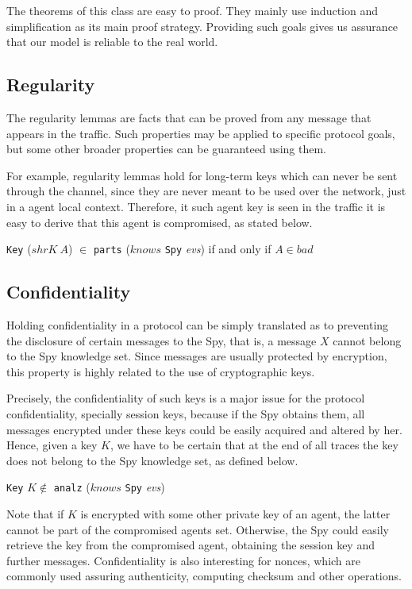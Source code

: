 The theorems of this class are easy to proof. They mainly use induction and simplification as its main proof strategy. Providing such goals gives us assurance that our model is reliable to the real world.



\subsection{Regularity}
The regularity lemmas are facts that can be proved from any message that appears in the traffic. Such properties may be applied to specific protocol goals, but some other broader properties can be guaranteed using them.

For example, regularity lemmas hold for long-term keys which can never be sent through the channel, since they are never meant to be used over the network, just in a agent local context. Therefore, it such agent key is seen in the traffic it is easy to derive that this agent is compromised, as stated below.

\begin{center}
  \texttt{Key} ($shrK\ A$) $\in$ \texttt{parts} ($knows$ \texttt{Spy} \textit{evs}) if and only if $A \in bad$
\end{center}



\subsection{Confidentiality}
Holding confidentiality in a protocol can be simply translated as to preventing the disclosure of certain messages to the Spy, that is, a message $X$ cannot belong to the Spy knowledge set. Since messages are usually protected by encryption, this property is highly related to the use of cryptographic keys.

Precisely, the confidentiality of such keys is a major issue for the protocol confidentiality, specially session keys, because if the Spy obtains them, all messages encrypted under these keys could be easily acquired and altered by her. Hence, given a key $K$, we have to be certain that at the end of all traces the key does not belong to the Spy knowledge set, as defined below.

\begin{center}
  \texttt{Key} $K \notin$ \texttt{analz} ($knows$ \texttt{Spy} \textit{evs})
\end{center}

Note that if $K$ is encrypted with some other private key of an agent, the latter cannot be part of the compromised agents set. Otherwise, the Spy could easily retrieve the key from the compromised agent, obtaining the session key and further messages. Confidentiality is also interesting for nonces, which are commonly used assuring authenticity, computing checksum and other operations.



